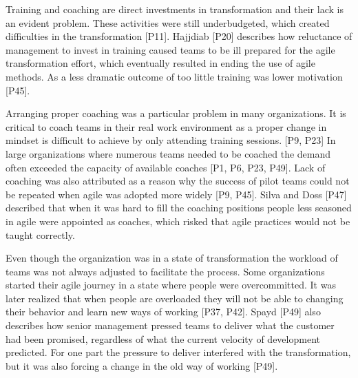 \documentclass[preprint,authoryear,12pt]{elsarticle}
\begin{document}

Training and coaching are direct investments in transformation and their lack is
an evident problem. These activities were still underbudgeted, which
created difficulties in the transformation [P11].
Hajjdiab [P20] describes how reluctance of management to invest in training
caused teams to be ill prepared for the agile transformation effort, which
eventually resulted in ending the use of agile methods. As a less dramatic
outcome of too little training was lower motivation [P45].

Arranging proper coaching was a particular problem in many organizations. It is
critical to coach teams in their real work environment as a proper change in
mindset is difficult to achieve by only attending training sessions. [P9, P23]
In large
organizations where numerous teams needed to be coached the demand often
exceeded the capacity of available coaches [P1, P6, P23, P49]. Lack of coaching
was also attributed as a reason why the success of pilot teams could not be
repeated when agile was adopted more widely [P9, P45].
Silva and Doss [P47] described that when it was hard to fill the coaching
positions people less seasoned in agile were appointed as coaches, which risked
that agile practices would not be taught correctly.




Even though the organization was in a state of transformation the workload of
teams was not always adjusted to facilitate the process.
Some organizations started their agile journey in a state where people were
overcommitted. It was later realized that when people are overloaded they will
not be able to changing their behavior and learn new ways of working [P37, P42].
Spayd [P49] also describes how senior management pressed teams to deliver what
the customer had been promised, regardless of what the current velocity of
development predicted. For one part the pressure to deliver interfered with the
transformation, but it was also forcing a change in the old way of working
[P49].
\end{document}
